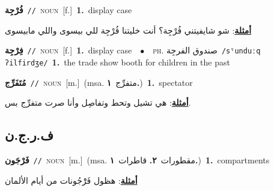 \documentclass[10pt,a4paper,twoside]{article} %
\begin{document}
\begin{multicols}{2}
{\setlength\topsep{0pt}\textbf{\foreignlanguage{arabic}{فُرْجِة}}\ {\color{gray}\texttt{//}\color{black}}\ \textsc{noun}\ [f.]\ \textbf{1.}~display case\  \begin{flushright}\color{gray}\foreignlanguage{arabic}{\textbf{\underline{\foreignlanguage{arabic}{أمثلة}}}: شو شايفيتني فُرْجِة؟ أنت خليتنا فُرْجِة للي بيسوى واللي مابيسوى}\end{flushright}\color{black}} \vspace{2mm}

{\setlength\topsep{0pt}\textbf{\foreignlanguage{arabic}{فِرْجِة}}\ {\color{gray}\texttt{//}\color{black}}\ \textsc{noun}\ [f.]\ \textbf{1.}~display case\ \ $\bullet$\ \ \textsc{ph.} \color{gray} \foreignlanguage{arabic}{صندوق الفرجِة}\color{black}\ {\color{gray}\texttt{/{\sffamily sˤunduːq ʔilfirdʒe}/}\color{black}}\ \textbf{1.}~the trade show booth for children in the past\ } \vspace{2mm}

{\setlength\topsep{0pt}\textbf{\foreignlanguage{arabic}{مُتَفَرِّج}}\ {\color{gray}\texttt{//}\color{black}}\ \textsc{noun}\ [m.]\ \color{gray}(msa. \foreignlanguage{arabic}{متفرِّج}~\foreignlanguage{arabic}{\textbf{١.}})\color{black}\ \textbf{1.}~spectator\  \begin{flushright}\color{gray}\foreignlanguage{arabic}{\textbf{\underline{\foreignlanguage{arabic}{أمثلة}}}: هي تشيل وتحط وتفاصِل وأنا صرت متفرِّج بس.}\end{flushright}\color{black}} \vspace{2mm}

\vspace{-3mm}
\subsection*{\color{blue}\foreignlanguage{arabic}{ف.ر.ج.ن}\color{blue}{ (ntws)}} 

{\setlength\topsep{0pt}\textbf{\foreignlanguage{arabic}{فَرْجَون}}\ {\color{gray}\texttt{//}\color{black}}\ \textsc{noun}\ [m.]\ \color{gray}(msa. \foreignlanguage{arabic}{مقطورات}~\foreignlanguage{arabic}{\textbf{٢.}}  \foreignlanguage{arabic}{قاطرات}~\foreignlanguage{arabic}{\textbf{١.}})\color{black}\ \textbf{1.}~compartments\  \begin{flushright}\color{gray}\foreignlanguage{arabic}{\textbf{\underline{\foreignlanguage{arabic}{أمثلة}}}: هظول فَرْْجُونات من أيام الألمان}\end{flushright}\color{black}} \vspace{2mm}


\end{multicols}
\end{document}

